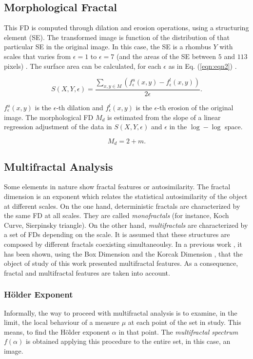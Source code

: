 \documentclass[oneside,a4paper,english,links]{amca}
\begin{document}
\subsection{Morphological Fractal}
This FD is computed through dilation and erosion operations, using a structuring element (SE). The transformed image is function of the distribution of that particular SE in the original image.  In this case, the SE is a rhombus $Y$ with scales that varies from $\epsilon = 1$ to $\epsilon = 7$ (and the areas of the SE between $5$ and $113$ pixels)  . The surface area can be calculated, for each $\epsilon$ as in Eq. (\ref{eqn:eqn2}) \cite{Gonzales2008}.

\begin{equation}
S(X,Y,\epsilon) = \frac{\sum_{x,y \in M} (f_{\epsilon}^{u}(x,y) - f_{\epsilon}^{l}(x,y))}{2\epsilon}.
\label{eqn:eqn2}
\end{equation}

$f_{\epsilon}^{u}(x,y)$ is the $\epsilon$-th dilation and $f_{\epsilon}^{l}(x,y)$ is the $\epsilon$-th erosion of the original image. The morphological FD $M_{d}$ is estimated from the slope of a linear regression adjustment of the data in $S(X,Y,\epsilon)$ and $\epsilon$ in the $\log-\log$ space.

\begin{equation}
M_{d} = 2 + m.
\label{eqn:eqn3}
\end{equation}

\subsection{Multifractal Analysis}
Some elements in nature show fractal features or autosimilarity. The fractal dimension is an exponent which relates the statistical autosimilarity of the object at different scales. On the one hand, deterministic fractals are characterized by the same FD at all scales. They are called {\em monofractals} (for instance, Koch Curve, Sierpinsky triangle). On the other hand, {\em multifractals} \cite{Mandelbrot89} are characterized by a set of FDs depending on the scale. It is assumed that these structures are composed by different fractals coexisting simultaneoulsy. In a previous work \cite{Baravalle2012}, it has been shown, using the Box Dimension and the Korcak Dimension \cite{Imre11}, that the object of study of this work presented multifractal features. As a consequence, fractal and multifractal features are taken into account.

\subsubsection*{H\"older Exponent}
Informally, the way to proceed with multifractal analysis is to examine, in the limit, the local behaviour of a measure $\mu$ at each point of the set in study. This means, to find the H\"older exponent $\alpha$ in that point. The {\em multifractal spectrum} $f(\alpha)$ is obtained applying this procedure to the entire set, in this case, an image.
\end{document}
